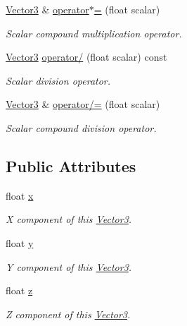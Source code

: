 \begin{DoxyCompactItemize}
\hyperlink{classchaos_1_1gfx_1_1_vector3}{Vector3} \& \hyperlink{classchaos_1_1gfx_1_1_vector3_abd751363ea77af4f9e673cf092f49473}{operator$\ast$=} (float scalar)
\begin{DoxyCompactList}\small\item\em Scalar compound multiplication operator. \end{DoxyCompactList}\item 
\hyperlink{classchaos_1_1gfx_1_1_vector3}{Vector3} \hyperlink{classchaos_1_1gfx_1_1_vector3_abc909457ea9721592932f00502978886}{operator/} (float scalar) const 
\begin{DoxyCompactList}\small\item\em Scalar division operator. \end{DoxyCompactList}\item 
\hyperlink{classchaos_1_1gfx_1_1_vector3}{Vector3} \& \hyperlink{classchaos_1_1gfx_1_1_vector3_a9f61bd9beaabb1de857258d96d46c093}{operator/=} (float scalar)
\begin{DoxyCompactList}\small\item\em Scalar compound division operator. \end{DoxyCompactList}\end{DoxyCompactItemize}
\subsection*{Public Attributes}
\begin{DoxyCompactItemize}
\item 
\hypertarget{classchaos_1_1gfx_1_1_vector3_ac58f0d4a6e611ae3eec8e9f56476fc13}{float \hyperlink{classchaos_1_1gfx_1_1_vector3_ac58f0d4a6e611ae3eec8e9f56476fc13}{x}}\label{classchaos_1_1gfx_1_1_vector3_ac58f0d4a6e611ae3eec8e9f56476fc13}

\begin{DoxyCompactList}\small\item\em X component of this \hyperlink{classchaos_1_1gfx_1_1_vector3}{Vector3}. \end{DoxyCompactList}\item 
\hypertarget{classchaos_1_1gfx_1_1_vector3_ac001a2e7468d6c6cfc5119d486817f0b}{float \hyperlink{classchaos_1_1gfx_1_1_vector3_ac001a2e7468d6c6cfc5119d486817f0b}{y}}\label{classchaos_1_1gfx_1_1_vector3_ac001a2e7468d6c6cfc5119d486817f0b}

\begin{DoxyCompactList}\small\item\em Y component of this \hyperlink{classchaos_1_1gfx_1_1_vector3}{Vector3}. \end{DoxyCompactList}\item 
\hypertarget{classchaos_1_1gfx_1_1_vector3_a7ec457e7ef3054557dacdc89bf7ce77b}{float \hyperlink{classchaos_1_1gfx_1_1_vector3_a7ec457e7ef3054557dacdc89bf7ce77b}{z}}\label{classchaos_1_1gfx_1_1_vector3_a7ec457e7ef3054557dacdc89bf7ce77b}

\begin{DoxyCompactList}\small\item\em Z component of this \hyperlink{classchaos_1_1gfx_1_1_vector3}{Vector3}. \end{DoxyCompactList}\end{DoxyCompactItemize}


